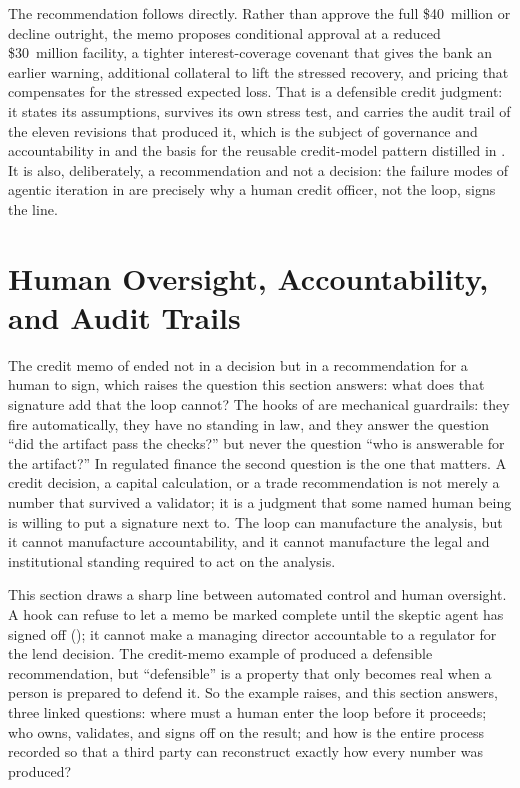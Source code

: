 The recommendation follows directly. Rather than approve the full \$40~million or
decline outright, the memo proposes conditional approval at a reduced \$30~million
facility, a tighter interest-coverage covenant that gives the bank an earlier
warning, additional collateral to lift the stressed recovery, and pricing that
compensates for the stressed expected loss. That is a defensible credit judgment: it
states its assumptions, survives its own stress test, and carries the audit trail of
the eleven revisions that produced it, which is the subject of governance and
accountability in  and the basis for the reusable
credit-model pattern distilled in . It is also,
deliberately, a recommendation and not a decision: the failure modes of agentic
iteration in  are precisely why a human credit officer, not
the loop, signs the line.

\section{Human Oversight, Accountability, and Audit Trails}\label{sec:human-oversight}

The credit memo of  ended not in a decision but in
a recommendation for a human to sign, which raises the question this section
answers: what does that signature add that the loop cannot? The hooks of
 are mechanical guardrails: they fire
automatically, they have no standing in law, and they answer the question ``did
the artifact pass the checks?'' but never the question ``who is answerable for
the artifact?'' In regulated finance the second question is the one that
matters. A credit decision, a capital calculation, or a trade recommendation is
not merely a number that survived a validator; it is a judgment that some named
human being is willing to put a signature next to. The loop can manufacture the
analysis, but it cannot manufacture accountability, and it cannot manufacture
the legal and institutional standing required to act on the analysis.

This section draws a sharp line between automated control and human oversight.
A hook can refuse to let a memo be marked complete until the skeptic agent has
signed off (); it cannot make a managing director
accountable to a regulator for the lend decision. The credit-memo example of
 produced a defensible recommendation, but
``defensible'' is a property that only becomes real when a person is prepared to
defend it. So the example raises, and this section answers, three linked
questions: where must a human enter the loop before it proceeds; who owns,
validates, and signs off on the result; and how is the entire process recorded
so that a third party can reconstruct exactly how every number was produced?

